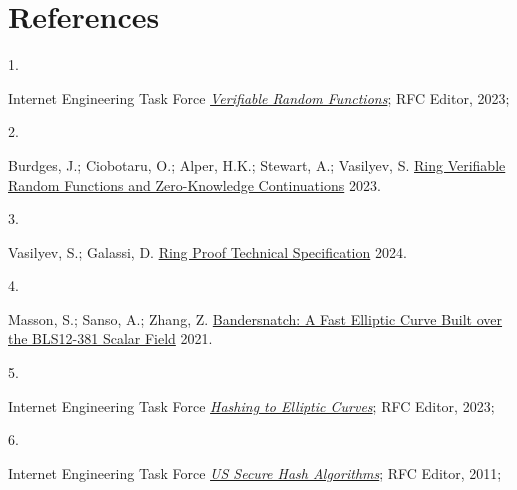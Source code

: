 \documentclass[
]{article}
\newlength{\cslhangindent}
\newlength{\csllabelwidth}
\newenvironment{CSLReferences}[2] %
 {\begin{list}{}{%
  \setlength{\itemindent}{0pt}
  \setlength{\leftmargin}{0pt}
  \setlength{\parsep}{0pt}
  \ifodd #1
   \setlength{\leftmargin}{\cslhangindent}
   \setlength{\itemindent}{-1\cslhangindent}
  \fi
  \setlength{\itemsep}{#2\baselineskip}}}
 {\end{list}}
\newcommand{\CSLLeftMargin}[1]{\parbox[t]{\csllabelwidth}{\strut#1\strut}}
\newcommand{\CSLRightInline}[1]{\parbox[t]{\linewidth - \csllabelwidth}{\strut#1\strut}}
\begin{document}
\section*{References}\label{references}

\label{refs}
\begin{CSLReferences}{0}{0}
\CSLLeftMargin{1. }%
\CSLRightInline{Internet Engineering Task Force
\emph{\href{https://datatracker.ietf.org/doc/rfc9381}{{Verifiable Random
Functions}}}; {RFC Editor}, 2023;}

\CSLLeftMargin{2. }%
\CSLRightInline{Burdges, J.; Ciobotaru, O.; Alper, H.K.; Stewart, A.;
Vasilyev, S. \href{https://eprint.iacr.org/2023/002}{Ring Verifiable
Random Functions and Zero-Knowledge Continuations} 2023.}

\CSLLeftMargin{3. }%
\CSLRightInline{Vasilyev, S.; Galassi, D.
\href{https://github.com/davxy/ring-proof-spec}{Ring Proof Technical
Specification} 2024.}

\CSLLeftMargin{4. }%
\CSLRightInline{Masson, S.; Sanso, A.; Zhang, Z.
\href{https://eprint.iacr.org/2021/1152}{Bandersnatch: A Fast Elliptic
Curve Built over the BLS12-381 Scalar Field} 2021.}

\CSLLeftMargin{5. }%
\CSLRightInline{Internet Engineering Task Force
\emph{\href{https://datatracker.ietf.org/doc/rfc9380}{{Hashing to
Elliptic Curves}}}; {RFC Editor}, 2023;}

\CSLLeftMargin{6. }%
\CSLRightInline{Internet Engineering Task Force
\emph{\href{https://datatracker.ietf.org/doc/rfc6234}{{US Secure Hash
Algorithms}}}; {RFC Editor}, 2011;}

\end{CSLReferences}
\end{document}
